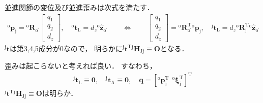 ﻿\documentclass[a4paper]{jsarticle}
\begin{document}
並進関節の変位及び並進歪みは次式を満たす．
\begin{align*}
{}^{\mathrm{o}}\bm{p}_{\mathrm{j}}={}^{\mathrm{o}}\bm{R}_{\mathrm{o}^\prime}\begin{bmatrix}
q_{1} \\ q_{2} \\ d_{z}
\end{bmatrix}
,\quad
{}^{\mathrm{o}}\bm{t}_{\mathrm{L}}=d_{z}{}^{\mathrm{o}}\hat{\bm{z}}_{\mathrm{o}^\prime}
\qquad\Leftrightarrow\qquad
\begin{bmatrix}
q_{1} \\ q_{2} \\ d_{z}
\end{bmatrix}
={}^{\mathrm{o}}\bm{R}_{\mathrm{o}^\prime}^{\mathrm{T}}{}^{\mathrm{o}}\bm{p}_{\mathrm{j}}
,\quad
{}^{\mathrm{j}}\bm{t}_{\mathrm{L}}=d_{z}{}^{\mathrm{o}}\bm{R}_{\mathrm{j}}^{\mathrm{T}}{}^{\mathrm{o}}\hat{\bm{z}}_{\mathrm{o}^\prime}
\end{align*}
${}^{\mathrm{j}}\bm{t}$は第3,4,5成分が0なので，
明らかに${}^{\mathrm{j}}\bm{t}^{\mathrm{T}}{}^{\mathrm{j}}\bm{H}_{\mathrm{Jj}}\equiv\bm{O}$となる．


\vspace{\baselineskip}


歪みは起こらないと考えれば良い．
すなわち，
\begin{align*}
{}^{\mathrm{j}}\bm{t}_{\mathrm{L}}\equiv\bm{0},\quad
{}^{\mathrm{j}}\bm{t}_{\mathrm{A}}\equiv\bm{0},\quad
\bm{q}=[{}^{\mathrm{o}}\bm{p}_{\mathrm{j}}^{\mathrm{T}}~~{}^{\mathrm{o}}\bm{\xi}_{\mathrm{j}}^{\mathrm{T}}]^{\mathrm{T}}
\end{align*}
${}^{\mathrm{j}}\bm{t}^{\mathrm{T}}{}^{\mathrm{j}}\bm{H}_{\mathrm{Jj}}\equiv\bm{O}$は明らか．
\end{document}
